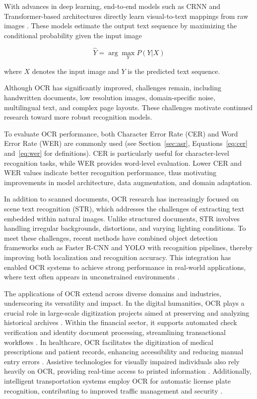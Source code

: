 With advances in deep learning, end-to-end models such as CRNN and Transformer-based architectures directly learn visual-to-text mappings from raw images \cite{shi2016crnn, baek2019whatiswrong, li2021trocr}. These models estimate the output text sequence by maximizing the conditional probability given the input image

\begin{equation*}
    \hat{Y} = \arg\max_{Y} P(Y|X)
\end{equation*}

where $X$ denotes the input image and $Y$ is the predicted text sequence.

Although OCR has significantly improved, challenges remain, including handwritten documents, low resolution images, domain-specific noise, multilingual text, and complex page layouts. These challenges motivate continued research toward more robust recognition models.

To evaluate OCR performance, both Character Error Rate (CER) and Word Error Rate (WER) are commonly used (see Section~\ref{sec:asr}, Equations~\ref{eq:cer} and~\ref{eq:wer} for definitions). CER is particularly useful for character-level recognition tasks, while WER provides word-level evaluation. Lower CER and WER values indicate better recognition performance, thus motivating improvements in model architecture, data augmentation, and domain adaptation.

In addition to scanned documents, OCR research has increasingly focused on scene text recognition (STR), which addresses the challenges of extracting text embedded within natural images. Unlike structured documents, STR involves handling irregular backgrounds, distortions, and varying lighting conditions. To meet these challenges, recent methods have combined object detection frameworks such as Faster R-CNN and YOLO with recognition pipelines, thereby improving both localization and recognition accuracy. This integration has enabled OCR systems to achieve strong performance in real-world applications, where text often appears in unconstrained environments \cite{baek2019whatiswrong}.

The applications of OCR extend across diverse domains and industries, underscoring its versatility and impact. In the digital humanities, OCR plays a crucial role in large-scale digitization projects aimed at preserving and analyzing historical archives \cite{holley2009howgood}. Within the financial sector, it supports automated check verification and identity document processing, streamlining transactional workflows \cite{govindaraju1994handwritten}. In healthcare, OCR facilitates the digitization of medical prescriptions and patient records, enhancing accessibility and reducing manual entry errors \cite{zhou2022automatic}. Assistive technologies for visually impaired individuals also rely heavily on OCR, providing real-time access to printed information \cite{anagnostopoulos2006license}. Additionally, intelligent transportation systems employ OCR for automatic license plate recognition, contributing to improved traffic management and security \cite{du2013automatic}.

